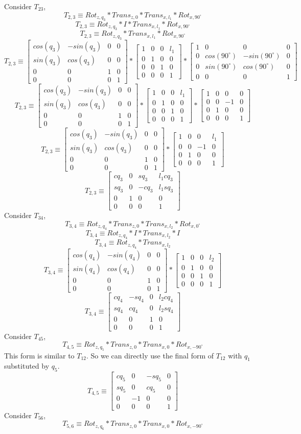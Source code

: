 \documentclass[12pt]{article}
\newcommand{\rx}[1]{\begin{bmatrix} 1 & 0 & 0 & 0 \\ 0 & cos(#1) & -sin(#1) & 0 \\ 0 & sin(#1) & cos(#1) & 0 \\ 0 & 0 & 0 & 1 \end{bmatrix}}
\newcommand{\rz}[1]{\begin{bmatrix} cos(#1) & -sin(#1) & 0 & 0 \\ sin(#1) & cos(#1) & 0 & 0 \\ 0 & 0 & 1 & 0 \\ 0 & 0 & 0 & 1 \end{bmatrix}}
\newcommand{\trans}[3]{\begin{bmatrix} 1 & 0 & 0 & #1 \\ 0 & 1 & 0 & #2 \\ 0 & 0 & 1 & #3 \\ 0 & 0 & 0 & 1 \end{bmatrix}}
\begin{document}
Consider $T_{23}$,
\[
  T_{2,3} \equiv Rot_{z,q_3} * Trans_{z, 0} * Trans_{x, l_1} * Rot_{x, 90^{\circ}}
\]
\[
  T_{2,3} \equiv Rot_{z,q_3} * I * Trans_{x, l_1} * Rot_{x, 90^{\circ}}
\]
\[
  T_{2,3} \equiv Rot_{z,q_3} * Trans_{x, l_1} * Rot_{x, 90^{\circ}}
\]
\[
  T_{2,3} \equiv \rz{q_3} * \trans{l_1}{0}{0} * \rx{90^{\circ}}
\]
\[
  T_{2,3} \equiv
  \rz{q_3}
  *
  \trans{l_1}{0}{0}
  *
  \begin{bmatrix} 1 & 0 & 0 & 0 \\ 0 & 0 & -1 & 0 \\ 0 & 1 & 0 & 0 \\ 0 & 0 & 0 & 1 \end{bmatrix}
\]
\[
  T_{2,3} \equiv
  \rz{q_3}
  *
  \begin{bmatrix} 1 & 0 & 0 & l_1 \\ 0 & 0 & -1 & 0 \\ 0 & 1 & 0 & 0 \\ 0 & 0 & 0 & 1 \end{bmatrix}
\]
\[
  T_{2,3} \equiv
  \begin{bmatrix} cq_3 & 0 & sq_3 & l_1cq_3 \\ sq_3 & 0 & -cq_3 & l_1sq_3 \\ 0 & 1 & 0 & 0 \\ 0 & 0 & 0 & 1 \end{bmatrix}
\]
Consider $T_{34}$,
\[
  T_{3,4} \equiv Rot_{z,q_4} * Trans_{z, 0} * Trans_{x, l_2} * Rot_{x, 0^{\circ}}
\]
\[
  T_{3,4} \equiv Rot_{z,q_4} * I * Trans_{x, l_2} * I
\]
\[
  T_{3,4} \equiv Rot_{z,q_4} * Trans_{x, l_2}
\]
\[
  T_{3,4} \equiv \rz{q_4} * \trans{l_2}{0}{0}
\]
\[
  T_{3,4} \equiv
  \begin{bmatrix} cq_4 & -sq_4 & 0 & l_2cq_4 \\ sq_4 & cq_4 & 0 & l_2sq_4 \\ 0 & 0 & 1 & 0 \\ 0 & 0 & 0 & 1 \end{bmatrix}
\]
Consider $T_{45}$,
\[
  T_{4,5} \equiv Rot_{z,q_5} * Trans_{z, 0} * Trans_{x, 0} * Rot_{x, -90^{\circ}}
\]
This form is similar to $T_{12}$. So we can directly use the final form of $T_{12}$ with $q_1$ substituted by $q_5$.
\[
  T_{4,5} \equiv
  \begin{bmatrix} cq_5 & 0 & -sq_5 & 0 \\ sq_5 & 0 & cq_5 & 0 \\ 0 & -1 & 0 & 0 \\ 0 & 0 & 0 & 1 \end{bmatrix}
\]
Consider $T_{56}$,
\[
  T_{5,6} \equiv Rot_{z,q_6} * Trans_{z, 0} * Trans_{x, 0} * Rot_{x, -90^{\circ}}
\]
\end{document}
